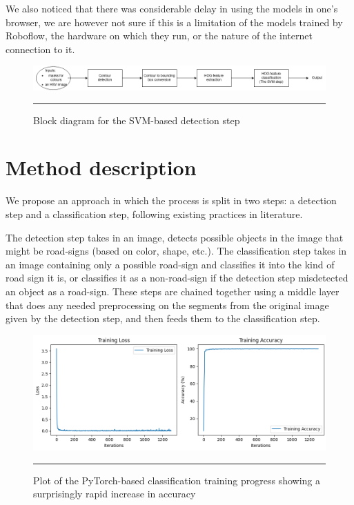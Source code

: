 \documentclass[conference]{IEEEtran}
\begin{document}
We also noticed that there was considerable delay in using the models in one's browser, we are however
not sure if this is a limitation of the models trained by Roboflow, the hardware on which they run, or
the nature of the internet connection to it.

\begin{figure}
    \includegraphics[width=\linewidth,]{Detection-Block-Diagram}
    \centering
    \caption{Block diagram for the SVM-based detection step}
    \noindent\rule{\textwidth}{1pt}
\end{figure}

\section{Method description}

We propose an approach in which the process is split in two steps: a detection step and a
classification step, following existing practices in literature.

The detection step takes in an image, detects possible objects in the image that might be
road-signs (based on color, shape, etc.). The classification step takes in an image containing
only a possible road-sign and classifies it into the kind of road sign it is, or classifies it
as a non-road-sign if the detection step misdetected an object as a road-sign. These steps are
chained together using a middle layer that does any needed preprocessing on the segments from
the original image given by the detection step, and then feeds them to the classification step.

\begin{figure}
    \includegraphics[width=\linewidth,]{overfit}
    \centering
    \label{img:training}
    \caption{Plot of the PyTorch-based classification training progress showing a surprisingly rapid increase in accuracy}
    \noindent\rule{\textwidth}{1pt}
\end{figure}
\end{document}
